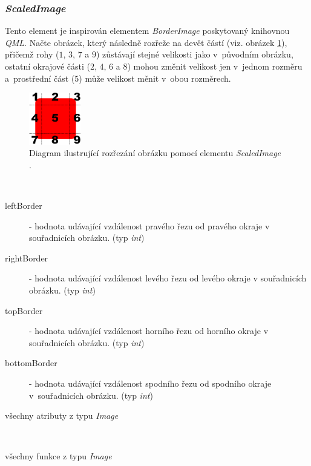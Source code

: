 \documentclass{article}
\begin{document}
\subsubsection{\label{SEC:scaled}\textit{ScaledImage}}
Tento element je inspirován elementem \textit{BorderImage} poskytovaný knihovnou \textit{QML}. Načte obrázek, který následně rozřeže na devět částí (viz. obrázek \ref{fig:cut}), přičemž rohy ($1$, $3$, $7$ a $9$) zůstávají stejné velikosti jako v~původním obrázku, ostatní okrajové části ($2$, $4$, $6$ a $8$) mohou změnit velikost jen v~jednom rozměru a~prostřední část ($5$) může velikost měnit v~obou rozměrech.\\
\begin{figure}[!ht]
\begin{center}
  \includegraphics[width=0.2\textwidth]{figures/imgCut}
\caption{{\label{fig:cut}}Diagram ilustrující rozřezání obrázku pomocí elementu \textit{ScaledImage} \cite{bib:borderedImage}.}
\end{center}
\end{figure}
\begin{description}
\item
\item[Seznam atributů:] ~
\begin{description}
\item[leftBorder] - hodnota udávající vzdálenost pravého řezu od pravého okraje v souřadnicích obrázku. (typ \textit{int})
\item[rightBorder] - hodnota udávající vzdálenost levého řezu od levého okraje v souřadnicích obrázku. (typ \textit{int})
\item[topBorder] - hodnota udávající vzdálenost horního řezu od horního okraje v souřadnicích obrázku. (typ \textit{int})
\item[bottomBorder] - hodnota udávající vzdálenost spodního řezu od spodního okraje v~souřadnicích obrázku. (typ \textit{int})
\item[všechny atributy z typu \textit{Image}]
\end{description}
\item[Seznam funkcí pro obsluhu událostí:] ~
\begin{description}
\item[všechny funkce z typu \textit{Image}]
\end{description}
\end{description}
\end{document}
